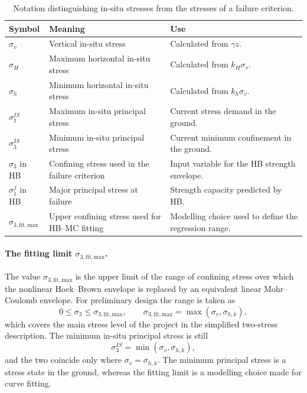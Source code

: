 \begin{table}[htbp]
\caption{Notation distinguishing in-situ stresses from the stresses of a failure criterion.}
\label{tab:notation_insitu_criterion}
\centering
\small
\begin{tabularx}{\textwidth}{l l Y}
\toprule
\textbf{Symbol} & \textbf{Meaning} & \textbf{Use} \\
\midrule
\(\sigma_v\) & Vertical in-situ stress & Calculated from \(\gamma z\). \\
\(\sigma_H\) & Maximum horizontal in-situ stress & Calculated from \(k_H\sigma_v\). \\
\(\sigma_h\) & Minimum horizontal in-situ stress & Calculated from \(k_h\sigma_v\). \\
\(\sigma_1^{IS}\) & Maximum in-situ principal stress & Current stress demand in the ground. \\
\(\sigma_3^{IS}\) & Minimum in-situ principal stress & Current minimum confinement in the ground. \\
\(\sigma_3\) in HB & Confining stress used in the failure criterion & Input variable for the HB strength envelope. \\
\(\sigma_1^f\) in HB & Major principal stress at failure & Strength capacity predicted by HB. \\
\(\sigma_{3,\mathrm{fit,max}}\) & Upper confining stress used for HB--MC fitting & Modelling choice used to define the regression range. \\
\bottomrule
\end{tabularx}
\end{table}

\paragraph{The fitting limit \(\sigma_{3,\mathrm{fit,max}}\).}
The value \(\sigma_{3,\mathrm{fit,max}}\) is the upper limit of the range of
confining stress over which the nonlinear Hoek--Brown envelope is replaced by
an equivalent linear Mohr--Coulomb envelope. For preliminary design the range
is taken as
\[
0 \leq \sigma_3 \leq \sigma_{3,\mathrm{fit,max}} ,
\qquad
\sigma_{3,\mathrm{fit,max}}=\max(\sigma_v,\sigma_{h,k}) ,
\]
which covers the main stress level of the project in the simplified
two-stress description. The minimum in-situ principal stress is still
\[
\sigma_3^{IS}=\min(\sigma_v,\sigma_{h,k}) ,
\]
and the two coincide only where \(\sigma_v=\sigma_{h,k}\). The minimum
principal stress is a stress state in the ground, whereas the fitting limit
is a modelling choice made for curve fitting.

